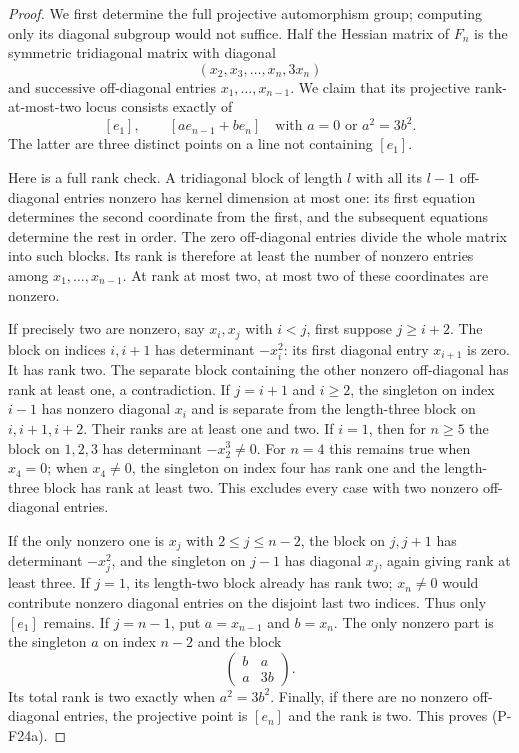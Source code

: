 \begin{proof}
We first determine the full projective automorphism group; computing
only its diagonal subgroup would not suffice. Half the Hessian matrix
of $F_n$ is the symmetric tridiagonal matrix with diagonal
\[
 (x_2,x_3,\ldots,x_n,3x_n)
\]
and successive off-diagonal entries $x_1,\ldots,x_{n-1}$.
We claim that its projective rank-at-most-two locus consists exactly of
\[
 [e_1],\qquad
 [a e_{n-1}+b e_n]\quad
 \text{with }a=0\text{ or }a^2=3b^2.
 \tag{P-F24a}
\]
The latter are three distinct points on a line not containing $[e_1]$.

Here is a full rank check. A tridiagonal block of length $l$ with
all its $l-1$ off-diagonal entries nonzero has kernel dimension at
most one: its first equation determines the second coordinate from
the first, and the subsequent equations determine the rest in order.
The zero off-diagonal entries divide the whole matrix into such
blocks. Its rank is therefore at least the number of nonzero
entries among $x_1,\ldots,x_{n-1}$. At rank at most two, at most
two of these coordinates are nonzero.

If precisely two are nonzero, say $x_i,x_j$ with $i<j$, first
suppose $j\ge i+2$. The block on indices $i,i+1$ has determinant
$-x_i^2$: its first diagonal entry $x_{i+1}$ is zero. It has
rank two. The separate block containing the other nonzero
off-diagonal has rank at least one, a contradiction. If
$j=i+1$ and $i\ge2$, the singleton on index $i-1$ has nonzero
diagonal $x_i$ and is separate from the length-three block on
$i,i+1,i+2$. Their ranks are at least one and two. If $i=1$,
then for $n\ge5$ the block on $1,2,3$ has determinant
$-x_2^3\ne0$. For $n=4$ this remains true when $x_4=0$;
when $x_4\ne0$, the singleton on index four has rank one and
the length-three block has rank at least two. This excludes
every case with two nonzero off-diagonal entries.

If the only nonzero one is $x_j$ with $2\le j\le n-2$,
the block on $j,j+1$ has determinant $-x_j^2$, and the
singleton on $j-1$ has diagonal $x_j$, again giving rank
at least three. If $j=1$, its length-two block already has
rank two; $x_n\ne0$ would contribute nonzero diagonal entries
on the disjoint last two indices. Thus only $[e_1]$ remains.
If $j=n-1$, put $a=x_{n-1}$ and $b=x_n$. The only nonzero
part is the singleton $a$ on index $n-2$ and the block
\[
 \begin{pmatrix}b&a\\a&3b\end{pmatrix}.
\]
Its total rank is two exactly when $a^2=3b^2$.
Finally, if there are no nonzero off-diagonal entries, the
projective point is $[e_n]$ and the rank is two. This proves
(P-F24a).


\end{proof}
